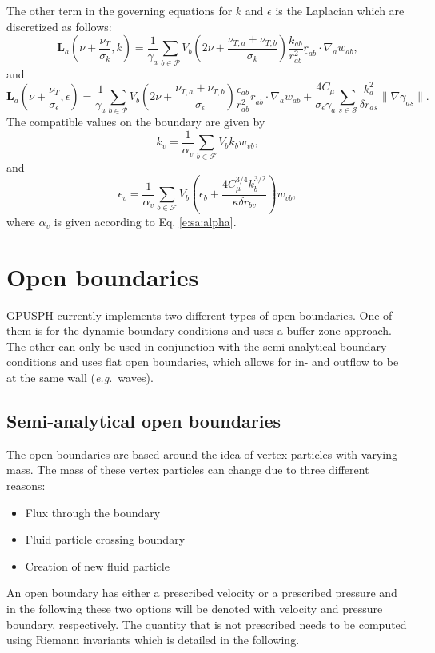 \documentclass[12pt]{memoir}
\newcommand{\uvec}[1]{\underline{#1}}
\newcommand{\eg}{\textit{e.g.}~}
\newcommand{\sumF}{\underset{b \in \mathcal{F}}{\sum}}
\newcommand{\sumP}{\underset{b \in \mathcal{P}}{\sum}}
\newcommand{\sumS}{\underset{s \in \mathcal{S}}{\sum}}
\newcommand{\Lap}{\textbf{L}}
\begin{document}
The other term in the governing equations for $k$ and $\epsilon$ is the
Laplacian which are discretized as follows:
\begin{equation}
\Lap_a(\nu + \frac{\nu_T}{\sigma_k}, k) = \frac{1}{\gamma_a}\sumP V_b
\left( 2\nu + \frac{\nu_{T,a} + \nu_{T,b}}{\sigma_k} \right)
\frac{k_{ab}}{r_{ab}^2}\uvec{r}_{ab}\cdot \nabla_a w_{ab},
\label{e:turb:k-lap-sa}
\end{equation}
and
\begin{equation}
\Lap_a(\nu + \frac{\nu_T}{\sigma_\epsilon}, \epsilon) = \frac{1}{\gamma_a}\sumP V_b
\left( 2\nu + \frac{\nu_{T,a} + \nu_{T,b}}{\sigma_\epsilon} \right)
\frac{\epsilon_{ab}}{r_{ab}^2}\uvec{r}_{ab}\cdot \nabla_a w_{ab} +
\frac{4 C_\mu}{\sigma_\epsilon \gamma_a}\sumS\frac{k_a^2}{\delta
r_{as}}\|\nabla \gamma_{as}\|.
\label{e:turb:eps-lap-sa}
\end{equation}
The compatible values on the boundary are given by
\begin{equation}
k_v = \frac{1}{\alpha_v}\sumF V_b k_b w_{vb},
\label{e:turb:k-bound-sa}
\end{equation}
and
\begin{equation}
\epsilon_v = \frac{1}{\alpha_v}\sumF V_b \left( \epsilon_b +
\frac{4 C_\mu^{3/4} k_b^{3/2}}{\kappa \delta r_{bv}} \right) w_{vb},
\label{e:turb:eps-bound-sa}
\end{equation}
where $\alpha_v$ is given according to Eq. \eqref{e:sa:alpha}.


\section{Open boundaries}
GPUSPH currently implements two different types of open boundaries. One
of them is for the dynamic boundary conditions and uses a buffer zone
approach. The other can only be used in conjunction with the
semi-analytical boundary conditions and uses flat open boundaries, which
allows for in- and outflow to be at the same wall (\eg waves).

\subsection{Semi-analytical open boundaries}

The open boundaries are based around the idea of vertex particles with
varying mass. The mass of these vertex particles can change due to three
different reasons:
\begin{itemize}
\item Flux through the boundary
\item Fluid particle crossing boundary
\item Creation of new fluid particle
\end{itemize}
An open boundary has either a prescribed velocity or a prescribed
pressure and in the following these two options will be denoted with
velocity and pressure boundary, respectively. The quantity that is not
prescribed needs to be computed using Riemann invariants which is
detailed in the following.
\end{document}
